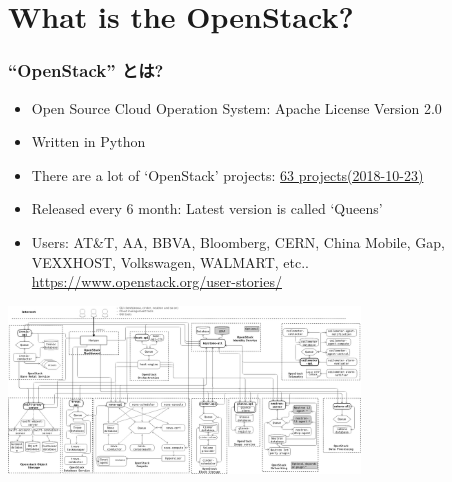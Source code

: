 \documentclass[aspectratio=169,11pt,hyperref={colorlinks=true}]{beamer}
\begin{document}
\section{What is the OpenStack?}
\begin{frame}
  \frametitle{``OpenStack'' とは?}
  \begin{itemize}
    \item Open Source Cloud Operation System: Apache License Version 2.0
    \item Written in Python
    \item There are a lot of `OpenStack' projects: \href{http://governance.openstack.org/reference/projects/index.html}{63 projects(2018-10-23)}
    \item Released every 6 month: Latest version is called `Queens'
    \item Users: \scriptsize{AT\&T, AA, BBVA, Bloomberg, CERN,
      China Mobile, Gap, VEXXHOST,
      Volkswagen, WALMART, etc.. \url{https://www.openstack.org/user-stories/}}
  \end{itemize}
  \begin{center}
    \includegraphics[width=0.7\textwidth]{images/openstack-arch-kilo-logical-v1.png}
  \end{center}
\end{frame}
\end{document}
